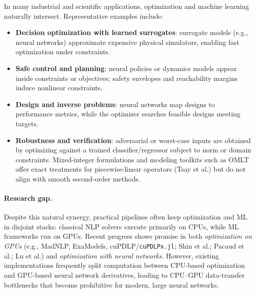 \documentclass[11pt]{article}
\begin{document}
In many industrial and scientific applications, optimization and machine learning naturally intersect. Representative examples include:
\begin{itemize}[leftmargin=1.5em]
  \item \textbf{Decision optimization with learned surrogates}: surrogate models (e.g., neural networks) approximate expensive physical simulators, enabling fast optimization under constraints.
  \item \textbf{Safe control and planning}: neural policies or dynamics models appear inside constraints or objectives; safety envelopes and reachability margins induce nonlinear constraints.
  \item \textbf{Design and inverse problems}: neural networks map designs to performance metrics, while the optimizer searches feasible designs meeting targets.
  \item \textbf{Robustness and verification}: adversarial or worst-case inputs are obtained by optimizing against a trained classifier/regressor subject to norm or domain constraints. Mixed-integer formulations and modeling toolkits such as OMLT offer exact treatments for piecewise-linear operators (Tsay et al.) but do not align with smooth second-order methods.
\end{itemize}

\paragraph{Research gap.} Despite this natural synergy, practical pipelines often keep optimization and ML in disjoint stacks: classical NLP solvers execute primarily on CPUs, while ML frameworks run on GPUs. Recent progress shows promise in both \emph{optimization on GPUs} (e.g., MadNLP, ExaModels, cuPDLP/\texttt{cuPDLPx.jl}; Shin et al.; Pacaud et al.; Lu et al.) and \emph{optimization with neural networks}. However, existing implementations frequently split computation between CPU-based optimization and GPU-based neural network derivatives, leading to CPU–GPU data-transfer bottlenecks that become prohibitive for modern, large neural networks.
\end{document}
